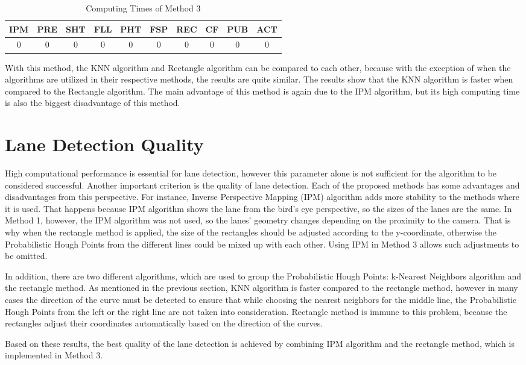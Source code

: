 \begin{table}[ht]
\caption{Computing Times of Method 3} 
\centering 
  \begin{tabular}{ | c | c | c | c | c | c | c | c | c | c |}
    \hline
  
  IPM 		& PRE 		& SHT	   & FLL 	   & PHT 	   & FSP 	    & REC 	   & CF 	  & PUB 	& ACT \\ \hline  
  0 & 0 & 0 & 0 & 0 & 0 & 0 & 0 & 0       & 0   \\ \hline  
    
    
      \end{tabular}
  \label{tab:Case3_Times}
\end{table}

With this method, the KNN algorithm and Rectangle algorithm can be compared to each other, because with the exception of when the algorithms are utilized in their respective methods, the results are quite similar. The results show that the KNN algorithm is faster when compared to the Rectangle algorithm. The main advantage of this method is again due to the IPM algorithm, but its high computing time is also the biggest disadvantage of this method.





\section{Lane Detection Quality}\label{sec:Lane Detection Quality}

High computational performance is essential for lane detection, however this parameter alone is not sufficient for the algorithm to be considered successful. Another important criterion is the quality of lane detection. Each of the proposed methods has some advantages and disadvantages from this perspective. For instance, Inverse Perspective Mapping (IPM) algorithm adds more stability to the methods where it is used. That happens because IPM algorithm shows the lane from the bird's eye perspective, so the sizes of the lanes are the same. In Method 1, however, the IPM algorithm was not used, so the lanes' geometry changes depending on the proximity to the camera. That is why when the rectangle method is applied, the size of the rectangles should be adjusted according to the y-coordinate, otherwise the Probabilistic Hough Points from the different lines could be mixed up with each other. Using IPM in Method 3 allows such adjustments to be omitted.

In addition, there are two different algorithms, which are used to group the Probabilistic Hough Points: k-Nearest Neighbors algorithm and the rectangle method. As mentioned in the previous section, KNN algorithm is faster compared to the rectangle method, however in many cases the direction of the curve must be detected to ensure that while choosing the nearest neighbors for the middle line, the Probabilistic Hough Points from the left or the right line are not taken into consideration. Rectangle method is immune to this problem, because the rectangles adjust their coordinates automatically based on the direction of the curves.

Based on these results, the best quality of the lane detection is  achieved by combining IPM algorithm and the rectangle method, which is implemented in Method 3.

